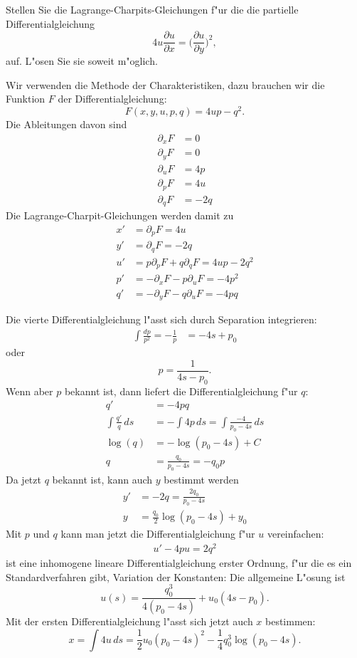 Stellen Sie die Lagrange-Charpits-Gleichungen f"ur die
die partielle Differentialgleichung
\[
4u\frac{\partial u}{\partial x}=\biggl(\frac{\partial u}{\partial y}\biggr)^2,
\]
auf. L"osen Sie sie soweit m"oglich.

\begin{loesung}
Wir verwenden die Methode der Charakteristiken, dazu brauchen wir die
Funktion $F$ der Differentialgleichung:
\[
F(x,y,u,p,q)=4up-q^2.
\]
Die Ableitungen davon sind
\begin{align*}
\partial_x F&=0\\
\partial_y F&=0\\
\partial_u F&=4p\\
\partial_p F&=4u\\
\partial_q F&=-2q
\end{align*}
Die Lagrange-Charpit-Gleichungen werden damit zu
\begin{align*}
x'&=\partial_pF=4u\\
y'&=\partial_qF=-2q\\
u'&=p\partial_pF+q\partial_qF=4up-2q^2\\
p'&=-\partial_xF-p\partial_uF=-4p^2\\
q'&=-\partial_yF-q\partial_uF=-4pq
\end{align*}

Die vierte Differentialgleichung l"asst sich durch Separation integrieren:
\begin{align*}
\int \frac{dp}{p^2}=-\frac1{p}&=-4s+p_0
\end{align*}
oder 
\[
p=\frac1{4s-p_0}.
\]
Wenn aber $p$ bekannt ist, dann liefert die Differentialgleichung
f"ur $q$:
\begin{align*}
q'&=-4pq
\\
\int \frac{q'}{q}\,ds&=-\int 4p\,ds=\int\frac{-4}{p_0-4s}\,ds
\\
\log(q)&=-\log(p_0-4s) + C\\
q&=\frac{q_0}{p_0-4s}=-q_0p
\end{align*}
Da jetzt $q$ bekannt ist, kann auch $y$ bestimmt werden
\begin{align*}
y'&=-2q=\frac{2q_0}{p_0-4s}\\
y&= \frac{q_0}2\log(p_0-4s)+y_0
\end{align*}
Mit $p$ und $q$ kann man jetzt die Differentialgleichung f"ur
$u$ vereinfachen:
\begin{align*}
u'-4pu=2q^2
\end{align*}
ist eine inhomogene lineare Differentialgleichung erster Ordnung,
f"ur die es ein Standardverfahren gibt, Variation der Konstanten:
Die allgemeine L"osung ist
\[
u(s)=\frac{q_0^3}{4(p_0-4s)} + u_0(4s-p_0).
\]
Mit der ersten Differentialgleichung l"asst sich jetzt auch $x$
bestimmen:
\[
x=\int 4u\,ds=
\frac{1}{2} u_0 (p_0-4 s)^2-\frac{1}{4} q_0^3 \log(p_0-4 s).
\]
\end{loesung}
